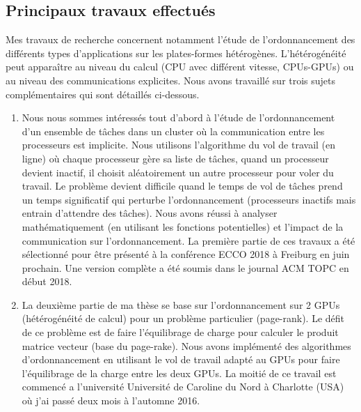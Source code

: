 \documentclass[11pt,final,french]{article}	%
\begin{document}


\subsection{Principaux travaux effectués}

Mes travaux de recherche concernent notamment l'étude de l'ordonnancement
des différents types d'applications sur les plates-formes hétérogènes.
L'hétérogénéité peut apparaître au niveau du calcul (CPU avec différent vitesse, CPUs-GPUs)
ou au niveau des communications explicites. 
Nous avons travaillé sur trois sujets complémentaires qui sont détaillés ci-dessous.

\begin{enumerate}
\item 
Nous nous sommes intéressés tout d'abord à l'étude de l'ordonnancement
d'un ensemble de tâches dans un cluster où la communication entre les processeurs est implicite.
Nous utilisons l'algorithme du vol de travail (en ligne) où chaque processeur gère sa liste de tâches,
quand un processeur devient inactif, il choisit aléatoirement un autre processeur pour voler du travail.
Le problème devient difficile quand le temps de vol de tâches prend un temps significatif qui perturbe
l'ordonnancement (processeurs inactifs mais entrain d'attendre des tâches).
Nous avons réussi à analyser mathématiquement (en utilisant les fonctions potentielles)
et l'impact de la communication sur l'ordonnancement.  
La première partie de ces travaux a été sélectionné pour être présenté à la conférence ECCO 2018
\cite{Nicolas:khatiri:Denis:Fred:2018} à Freiburg en juin prochain.
Une version complète a été soumis dans le journal ACM TOPC en début 2018.

\item 
La deuxième partie de ma thèse se base sur l'ordonnancement sur 2 GPUs (hétérogénéité de calcul)
pour un problème particulier (page-rank).
Le défit de ce problème est de faire l'équilibrage de charge pour calculer le produit matrice vecteur (base du page-rake).
Nous avons implémenté des algorithmes d'ordonnancement en utilisant le vol de travail adapté au GPUs pour faire l'équilibrage de la charge entre les deux GPUs.
La moitié de ce travail est commencé a l'université Université de Caroline du Nord à Charlotte (USA)
où j'ai passé deux mois à l'automne 2016.


\end{enumerate}
\end{document}
